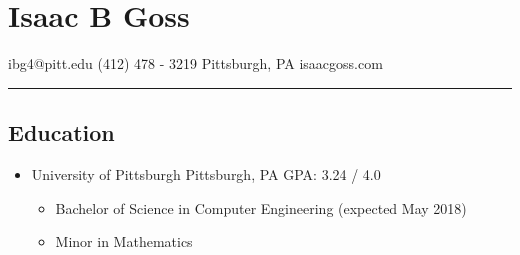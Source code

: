 \documentclass[18pt]{article}
\providecommand{\tightlist}{
    \setlength{\itemsep}{0pt}\setlength{\parskip}{0pt}
}
\begin{document}
  \section*{Isaac B Goss}\label{isaac-b-goss}
    ibg4@pitt.edu \textbar{} (412) 478 - 3219 \textbar{} Pittsburgh, PA \textbar{} isaacgoss.com
    
    \hrule
    
    \subsection*{Education}\label{education}      
      \begin{itemize}\tightlist
        \item University of Pittsburgh \textbar{} Pittsburgh, PA \textbar{} GPA: 3.24 / 4.0
        \begin{itemize}\tightlist
          \item Bachelor of Science in Computer Engineering (expected May 2018)
          \item Minor in Mathematics
        \end{itemize}
      \end{itemize}
      
\end{document}
